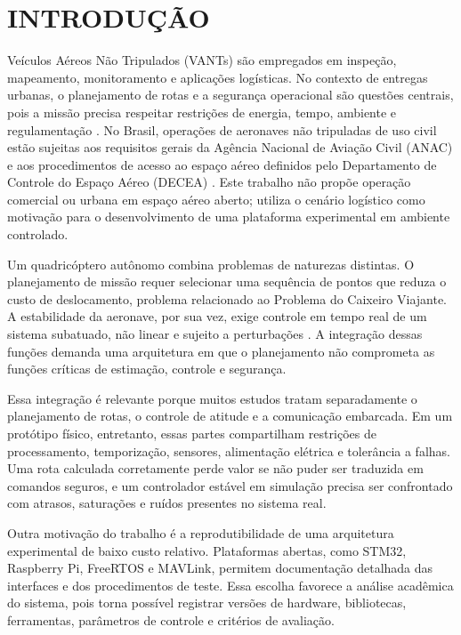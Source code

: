 \chapter{INTRODUÇÃO}\label{cap:introducao}

Veículos Aéreos Não Tripulados (VANTs) são empregados em inspeção, mapeamento, monitoramento e aplicações logísticas. No contexto de entregas urbanas, o planejamento de rotas e a segurança operacional são questões centrais, pois a missão precisa respeitar restrições de energia, tempo, ambiente e regulamentação \cite{otto2018,rinaldi2024}. No Brasil, operações de aeronaves não tripuladas de uso civil estão sujeitas aos requisitos gerais da Agência Nacional de Aviação Civil (ANAC) e aos procedimentos de acesso ao espaço aéreo definidos pelo Departamento de Controle do Espaço Aéreo (DECEA) \cite{anac2026,decea2026}. Este trabalho não propõe operação comercial ou urbana em espaço aéreo aberto; utiliza o cenário logístico como motivação para o desenvolvimento de uma plataforma experimental em ambiente controlado.

Um quadricóptero autônomo combina problemas de naturezas distintas. O planejamento de missão requer selecionar uma sequência de pontos que reduza o custo de deslocamento, problema relacionado ao Problema do Caixeiro Viajante. A estabilidade da aeronave, por sua vez, exige controle em tempo real de um sistema subatuado, não linear e sujeito a perturbações \cite{beard2012,quan2017}. A integração dessas funções demanda uma arquitetura em que o planejamento não comprometa as funções críticas de estimação, controle e segurança.

Essa integração é relevante porque muitos estudos tratam separadamente o planejamento de rotas, o controle de atitude e a comunicação embarcada. Em um protótipo físico, entretanto, essas partes compartilham restrições de processamento, temporização, sensores, alimentação elétrica e tolerância a falhas. Uma rota calculada corretamente perde valor se não puder ser traduzida em comandos seguros, e um controlador estável em simulação precisa ser confrontado com atrasos, saturações e ruídos presentes no sistema real.

Outra motivação do trabalho é a reprodutibilidade de uma arquitetura experimental de baixo custo relativo. Plataformas abertas, como STM32, Raspberry Pi, FreeRTOS e MAVLink, permitem documentação detalhada das interfaces e dos procedimentos de teste. Essa escolha favorece a análise acadêmica do sistema, pois torna possível registrar versões de hardware, bibliotecas, ferramentas, parâmetros de controle e critérios de avaliação.

